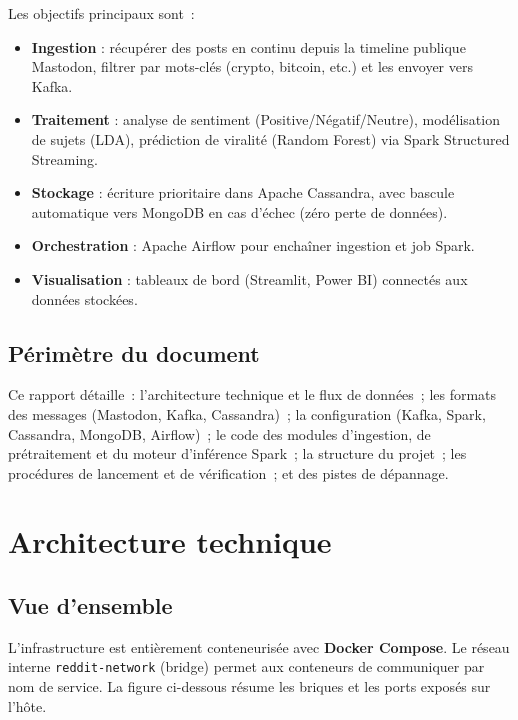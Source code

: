 \documentclass[12pt,a4paper]{article}
\begin{document}
Les objectifs principaux sont~:
\begin{itemize}[leftmargin=*]
  \item \textbf{Ingestion} : récupérer des posts en continu depuis la timeline publique Mastodon, filtrer par mots-clés (crypto, bitcoin, etc.) et les envoyer vers Kafka.
  \item \textbf{Traitement} : analyse de sentiment (Positive/Négatif/Neutre), modélisation de sujets (LDA), prédiction de viralité (Random Forest) via Spark Structured Streaming.
  \item \textbf{Stockage} : écriture prioritaire dans Apache Cassandra, avec bascule automatique vers MongoDB en cas d'échec (zéro perte de données).
  \item \textbf{Orchestration} : Apache Airflow pour enchaîner ingestion et job Spark.
  \item \textbf{Visualisation} : tableaux de bord (Streamlit, Power BI) connectés aux données stockées.
\end{itemize}

\subsection{Périmètre du document}

Ce rapport détaille~: l'architecture technique et le flux de données~; les formats des messages (Mastodon, Kafka, Cassandra)~; la configuration (Kafka, Spark, Cassandra, MongoDB, Airflow)~; le code des modules d'ingestion, de prétraitement et du moteur d'inférence Spark~; la structure du projet~; les procédures de lancement et de vérification~; et des pistes de dépannage.

\section{Architecture technique}

\subsection{Vue d'ensemble}

L'infrastructure est entièrement conteneurisée avec \textbf{Docker Compose}. Le réseau interne \texttt{reddit-network} (bridge) permet aux conteneurs de communiquer par nom de service. La figure ci-dessous résume les briques et les ports exposés sur l'hôte.
\end{document}
